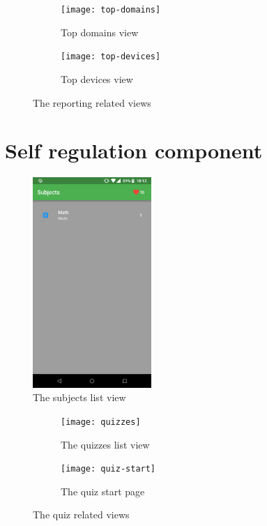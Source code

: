 \begin{figure}
\centering
\begin{subfigure}{.5\textwidth}
  \centering
  \texttt{[image: top-domains]}
  \caption{Top domains view}
  \label{fig:top-domains}
\end{subfigure}%
\begin{subfigure}{.5\textwidth}
  \centering
  \texttt{[image: top-devices]}
  \caption{Top devices view}
  \label{fig:top-devices}
\end{subfigure}
\caption{The reporting related views}
\label{fig:top-views}
\end{figure}

\section{Self regulation component}

\begin{figure}[th]
\centering
\includegraphics[width=0.4\textwidth]{Figures/subjects}
\decoRule
\caption{The subjects list view}
\label{fig:subjects}
\end{figure}

\begin{figure}
\centering
\begin{subfigure}{.5\textwidth}
  \centering
  \texttt{[image: quizzes]}
  \caption{The quizzes list view}
  \label{fig:quizzes}
\end{subfigure}%
\begin{subfigure}{.5\textwidth}
  \centering
  \texttt{[image: quiz-start]}
  \caption{The quiz start page}
  \label{fig:quiz-start}
\end{subfigure}
\caption{The quiz related views}
\label{fig:quiz-views}
\end{figure}

